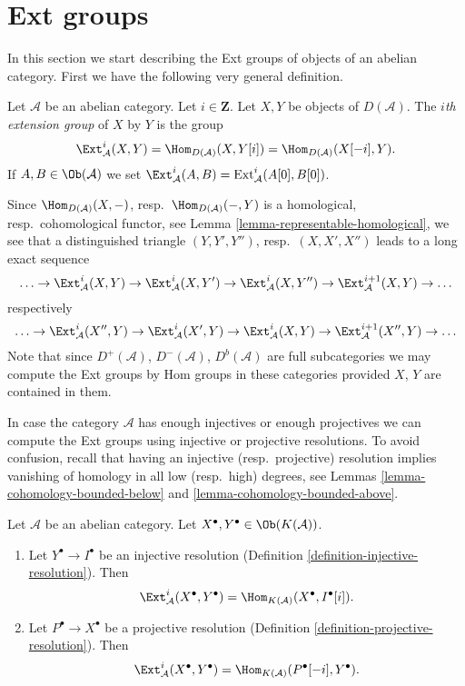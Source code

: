 \section{Ext groups}
\label{section-ext}

\noindent
In this section we start describing the Ext groups of objects
of an abelian category. First we have the following very general
definition.

\begin{definition}
\label{definition-ext}
Let $\mathcal{A}$ be an abelian category. Let $i \in \mathbf{Z}$. Let
$X, Y$ be objects of $D(\mathcal{A})$. The {\it $i$th extension group}
of $X$ by $Y$ is the group
$$
\Ext^i_\mathcal{A}(X, Y) =
\Hom_{D(\mathcal{A})}(X, Y[i]) =
\Hom_{D(\mathcal{A})}(X[-i], Y).
$$
If $A, B \in \Ob(\mathcal{A})$ we set
$\Ext^i_\mathcal{A}(A, B) = \text{Ext}^i_\mathcal{A}(A[0], B[0])$.
\end{definition}

\noindent
Since $\Hom_{D(\mathcal{A})}(X, -)$,
resp.\ $\Hom_{D(\mathcal{A})}(-, Y)$ is a homological,
resp.\ cohomological functor, see
Lemma \ref{lemma-representable-homological},
we see that a distinguished triangle $(Y, Y', Y'')$,
resp.\ $(X, X', X'')$ leads to a long exact sequence
$$
\ldots \to
\Ext^i_\mathcal{A}(X, Y) \to
\Ext^i_\mathcal{A}(X, Y') \to
\Ext^i_\mathcal{A}(X, Y'') \to
\Ext^{i + 1}_\mathcal{A}(X, Y) \to \ldots
$$
respectively
$$
\ldots \to
\Ext^i_\mathcal{A}(X'', Y) \to
\Ext^i_\mathcal{A}(X', Y) \to
\Ext^i_\mathcal{A}(X, Y) \to
\Ext^{i + 1}_\mathcal{A}(X'', Y) \to \ldots
$$
Note that since $D^+(\mathcal{A})$, $D^-(\mathcal{A})$, $D^b(\mathcal{A})$
are full subcategories we may compute the Ext groups by Hom groups
in these categories provided $X$, $Y$ are contained in them.

\noindent
In case the category $\mathcal{A}$ has enough injectives or enough
projectives we can compute the Ext groups using injective or
projective resolutions. To avoid confusion, recall that having an
injective (resp.\ projective) resolution implies vanishing of homology
in all low (resp.\ high) degrees, see
Lemmas \ref{lemma-cohomology-bounded-below} and
\ref{lemma-cohomology-bounded-above}.

\begin{lemma}
\label{lemma-compute-ext-resolutions}
Let $\mathcal{A}$ be an abelian category.
Let $X^\bullet, Y^\bullet \in \Ob(K(\mathcal{A}))$.
\begin{enumerate}
\item Let $Y^\bullet \to I^\bullet$ be an injective resolution
(Definition \ref{definition-injective-resolution}). Then
$$
\Ext^i_\mathcal{A}(X^\bullet, Y^\bullet) =
\Hom_{K(\mathcal{A})}(X^\bullet, I^\bullet[i]).
$$
\item Let $P^\bullet \to X^\bullet$ be a projective resolution
(Definition \ref{definition-projective-resolution}). Then
$$
\Ext^i_\mathcal{A}(X^\bullet, Y^\bullet) =
\Hom_{K(\mathcal{A})}(P^\bullet[-i], Y^\bullet).
$$
\end{enumerate}
\end{lemma}


